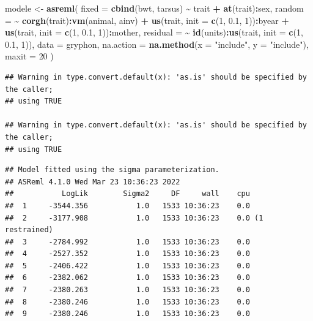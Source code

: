\documentclass[
  12pt,
]{book}
\newenvironment{Shaded}{\begin{snugshade}}{\end{snugshade}}
\newcommand{\DataTypeTok}[1]{\textcolor[rgb]{0.13,0.29,0.53}{#1}}
\newcommand{\DecValTok}[1]{\textcolor[rgb]{0.00,0.00,0.81}{#1}}
\newcommand{\FloatTok}[1]{\textcolor[rgb]{0.00,0.00,0.81}{#1}}
\newcommand{\KeywordTok}[1]{\textcolor[rgb]{0.13,0.29,0.53}{\textbf{#1}}}
\newcommand{\NormalTok}[1]{#1}
\newcommand{\OperatorTok}[1]{\textcolor[rgb]{0.81,0.36,0.00}{\textbf{#1}}}
\newcommand{\StringTok}[1]{\textcolor[rgb]{0.31,0.60,0.02}{#1}}
\begin{document}
\begin{Shaded}
\begin{Highlighting}[]
\NormalTok{modele \textless{}{-}}\StringTok{ }\KeywordTok{asreml}\NormalTok{(}
  \DataTypeTok{fixed =} \KeywordTok{cbind}\NormalTok{(bwt, tarsus) }\OperatorTok{\textasciitilde{}}\StringTok{ }\NormalTok{trait }\OperatorTok{+}\StringTok{ }\KeywordTok{at}\NormalTok{(trait)}\OperatorTok{:}\NormalTok{sex,}
  \DataTypeTok{random =} \OperatorTok{\textasciitilde{}}\StringTok{ }\KeywordTok{corgh}\NormalTok{(trait)}\OperatorTok{:}\KeywordTok{vm}\NormalTok{(animal, ainv) }\OperatorTok{+}
\StringTok{    }\KeywordTok{us}\NormalTok{(trait, }\DataTypeTok{init =} \KeywordTok{c}\NormalTok{(}\DecValTok{1}\NormalTok{, }\FloatTok{0.1}\NormalTok{, }\DecValTok{1}\NormalTok{))}\OperatorTok{:}\NormalTok{byear }\OperatorTok{+}
\StringTok{    }\KeywordTok{us}\NormalTok{(trait, }\DataTypeTok{init =} \KeywordTok{c}\NormalTok{(}\DecValTok{1}\NormalTok{, }\FloatTok{0.1}\NormalTok{, }\DecValTok{1}\NormalTok{))}\OperatorTok{:}\NormalTok{mother,}
  \DataTypeTok{residual =} \OperatorTok{\textasciitilde{}}\StringTok{ }\KeywordTok{id}\NormalTok{(units)}\OperatorTok{:}\KeywordTok{us}\NormalTok{(trait, }\DataTypeTok{init =} \KeywordTok{c}\NormalTok{(}\DecValTok{1}\NormalTok{, }\FloatTok{0.1}\NormalTok{, }\DecValTok{1}\NormalTok{)),}
  \DataTypeTok{data =}\NormalTok{ gryphon,}
  \DataTypeTok{na.action =} \KeywordTok{na.method}\NormalTok{(}\DataTypeTok{x =} \StringTok{"include"}\NormalTok{, }\DataTypeTok{y =} \StringTok{"include"}\NormalTok{),}
  \DataTypeTok{maxit =} \DecValTok{20}
\NormalTok{)}
\end{Highlighting}
\end{Shaded}

\begin{verbatim}
## Warning in type.convert.default(x): 'as.is' should be specified by the caller;
## using TRUE

## Warning in type.convert.default(x): 'as.is' should be specified by the caller;
## using TRUE
\end{verbatim}

\begin{verbatim}
## Model fitted using the sigma parameterization.
## ASReml 4.1.0 Wed Mar 23 10:36:23 2022
##           LogLik        Sigma2     DF     wall    cpu
##  1     -3544.356           1.0   1533 10:36:23    0.0
##  2     -3177.908           1.0   1533 10:36:23    0.0 (1 restrained)
##  3     -2784.992           1.0   1533 10:36:23    0.0
##  4     -2527.352           1.0   1533 10:36:23    0.0
##  5     -2406.422           1.0   1533 10:36:23    0.0
##  6     -2382.062           1.0   1533 10:36:23    0.0
##  7     -2380.263           1.0   1533 10:36:23    0.0
##  8     -2380.246           1.0   1533 10:36:23    0.0
##  9     -2380.246           1.0   1533 10:36:23    0.0
\end{verbatim}
\end{document}
